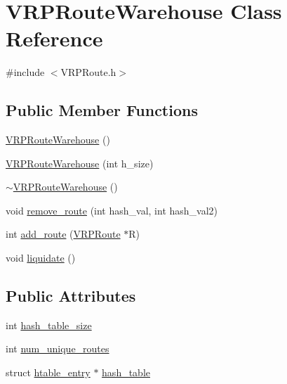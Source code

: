 \hypertarget{class_v_r_p_route_warehouse}{
\section{VRPRouteWarehouse Class Reference}
\label{class_v_r_p_route_warehouse}
}


{\ttfamily \#include $<$VRPRoute.h$>$}

\subsection*{Public Member Functions}
\begin{DoxyCompactItemize}
\item 
\hyperlink{class_v_r_p_route_warehouse_ac478d98e35034dc954c1d08ea19f1084}{VRPRouteWarehouse} ()
\item 
\hyperlink{class_v_r_p_route_warehouse_ab0c6e50d4c3c0ddc3dd78a90441b26e1}{VRPRouteWarehouse} (int h\_\-size)
\item 
\hyperlink{class_v_r_p_route_warehouse_a8c7beebd2a1becb6a243084a07db312d}{$\sim$VRPRouteWarehouse} ()
\item 
void \hyperlink{class_v_r_p_route_warehouse_ab6b1e322a098158aac9adc823cd77160}{remove\_\-route} (int hash\_\-val, int hash\_\-val2)
\item 
int \hyperlink{class_v_r_p_route_warehouse_a0660d0618b8ad9eab3599d50bb1971d0}{add\_\-route} (\hyperlink{class_v_r_p_route}{VRPRoute} $\ast$R)
\item 
void \hyperlink{class_v_r_p_route_warehouse_a0ff6f41a119c1355bd66ae1368b29669}{liquidate} ()
\end{DoxyCompactItemize}
\subsection*{Public Attributes}
\begin{DoxyCompactItemize}
\item 
int \hyperlink{class_v_r_p_route_warehouse_a3e8178b420c9564630ef7a22cb373d52}{hash\_\-table\_\-size}
\item 
int \hyperlink{class_v_r_p_route_warehouse_a5af11f134bc36342b2c90e594e76e368}{num\_\-unique\_\-routes}
\item 
struct \hyperlink{structhtable__entry}{htable\_\-entry} $\ast$ \hyperlink{class_v_r_p_route_warehouse_a6d689a2027fb915283aaf683e8fad29e}{hash\_\-table}
\end{DoxyCompactItemize}



